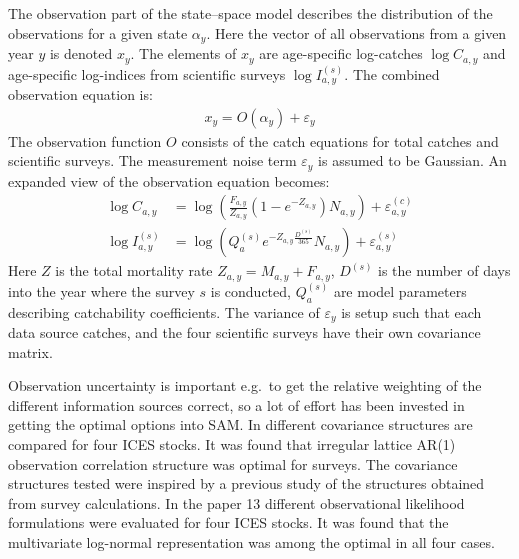 \documentclass[12pt,letterpaper, leqno]{article}
\begin{document}
The observation part of the state--space model describes the distribution of the observations for a given state $\alpha_y$. Here the vector of all observations from a given year $y$ is denoted $x_y$. The elements of $x_y$ are age-specific log-catches $\log C_{a,y}$ and age-specific log-indices from scientific surveys $\log I^{(s)}_{a,y}$.  The combined observation equation is:
 \begin{align*}
 x_y=O(\alpha_y)+\varepsilon_y
 \end{align*}
 The observation function $O$ consists of the catch equations for total catches and scientific surveys. The measurement noise term $\varepsilon_y$ is assumed to be Gaussian. An expanded view of the observation equation becomes:
 \begin{align*}
 \log C_{a,y} &= 
\log\left(\frac{F_{a,y}}{Z_{a,y}}(1-e^{-Z_{a,y}})N_{a,y}\right)+\varepsilon^{(c)}_{a,y}\\
 \log I^{(s)}_{a,y} &= 
 \log\left(Q^{(s)}_a e^{-Z_{a,y}\frac{D^{(s)}}{365}}N_{a,y}\right)+\varepsilon^{(s)}_{a,y}
\end{align*}   
Here $Z$ is the total mortality rate $Z_{a,y}=M_{a,y}+F_{a,y}$, $D^{(s)}$ is the number of days into the year where the survey $s$ is conducted, $Q^{(s)}_a$ are model parameters describing catchability coefficients. The variance of $\varepsilon_y$ is setup such that each data source catches, and the four scientific surveys have their own covariance matrix. 

Observation uncertainty is important e.g.~to get the relative weighting of the different information sources correct, so a lot of effort has been invested in getting the optimal options into SAM. In \citet{berg2016accounting} different covariance structures are compared for four ICES stocks. It was found that irregular lattice AR(1) observation correlation structure was optimal for surveys. The covariance structures tested were inspired by a previous study \citep{berg2014evaluation} of the structures obtained from survey calculations. In the paper \citet{albertsen2016choosing} 13 different observational likelihood formulations were evaluated for four ICES stocks. It was found that the multivariate log-normal representation was among the optimal in all four cases.
\end{document}
